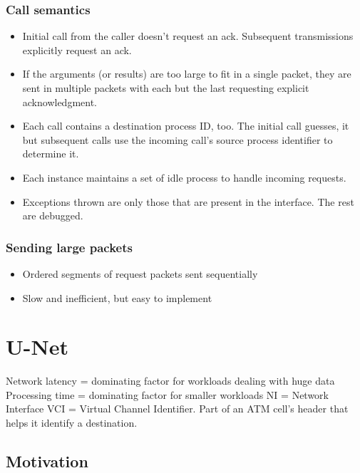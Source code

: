 \documentclass[a4paper]{article}
\begin{document}
\subsubsection{Call semantics}
\begin{itemize}
    \item Initial call from the caller doesn't request an ack. Subsequent transmissions explicitly request an ack.
    \item If the arguments (or results) are too large to fit in a single packet, they are sent in multiple packets with each but the last requesting explicit acknowledgment.
    \item Each call contains a destination process ID, too. The initial call guesses, it but subsequent calls use the incoming call's source process identifier to determine it.
    \item Each instance maintains a set of idle process to handle incoming requests.
    \item Exceptions thrown are only those that are present in the interface. The rest are debugged.
\end{itemize}


\subsubsection{Sending large packets}

\begin{itemize}
\item
    Ordered segments of request packets sent sequentially
\item
    Slow and inefficient, but easy to implement
\end{itemize}

\newpage

\section{U-Net}

Network latency = dominating factor for workloads dealing with huge data\\
Processing time = dominating factor for smaller workloads
NI = Network Interface
VCI = Virtual Channel Identifier. Part of an ATM cell's header that helps it identify a destination.

\subsection{Motivation}
\end{document}
